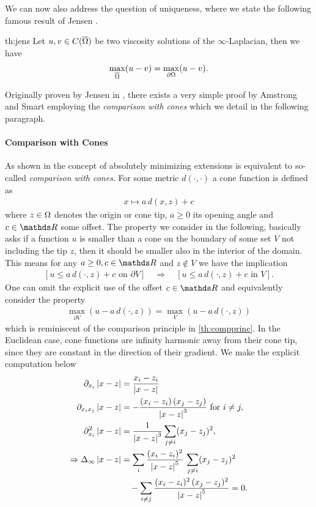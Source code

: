 We can now also address the question of uniqueness, where we state the following famous result of Jensen \cite{jensen1993uniqueness}.
%
\begin{theorem}{\cite{jensen1993uniqueness}}{th:jens} 
Let $u,v\in C(\overline{\Omega})$ be two viscosity solutions of the $\infty$-Laplacian, then we have
%
\begin{align*}
\max_{\overline{\Omega}} (u - v) = \max_{\partial\Omega} (u - v).
\end{align*}
\end{theorem}
%
%
\noindent%
Originally proven by Jensen in \cite{jensen1993uniqueness}, there exists a very simple proof by Amstrong and Smart \cite{armstrong2010easy} employing the \emph{comparison with cones} which we detail in the following paragraph.
%
%
%
\paragraph{Comparison with Cones} As shown in \cite{aronsson2004tour} the concept of absolutely minimizing extensions is equivalent to so-called \emph{comparison with cones}. For some metric $d(\cdot,\cdot)$ a cone function is defined as
%
\begin{align*}
x\mapsto a\, d(x,z) + c
\end{align*}
%
where $z\in\Omega$ denotes the origin or cone tip, $a\geq 0$ its opening angle and $c\in\R$ some offset. The property we consider in the following, basically asks if a function $u$ is smaller than a cone on the boundary of some set $V$ not including the tip $z$, then it should be smaller also in the interior of the domain. This means for any $a\geq 0,c\in\R$ and $z\notin V$ we have the implication
%
\begin{align*}
\left[u \leq a\, d(\cdot,z) + c \text{ on }\partial V\right]
\quad \Rightarrow\quad
\left[u \leq a\, d(\cdot,z) + c \text{ in } V\right].
\end{align*}
%
%
One can omit the explicit use of the offset $c\in\R$ and equivalently consider the property
%
\begin{align}\label{eq:conecont}
\max_{\partial V}\left(u - a\, d(\cdot,z)\right) = \max_{V}\left(u - a\, d(\cdot,z)\right)
\end{align}
%
which is reminiscent of the comparison principle in \cref{th:compprinc}. In the Euclidean case, cone functions are infinity harmonic away from their cone tip, since they are constant in the direction of their gradient. We make the explicit computation below
%
\begin{align*}
\partial_{x_i} \abs{x-z} &= \frac{x_i - z_i}{\abs{x-z}}\\
\partial_{x_i x_j}\abs{x-z} &= -\frac{(x_i - z_i)\, (x_j - z_j)}{\abs{x-z}^3}\text{ for } i\neq j,\\
\partial_{x_i}^2\abs{x-z} &= \frac{1}{\abs{x-z}^3} \sum_{j\neq i} (x_j - z_j)^2,\\
\Rightarrow
\Delta_\infty \abs{x-z} &= 
%
\sum_{i} \frac{(x_i - z_i)^2}{\abs{x-z}^5} \, \sum_{j\neq i} (x_j - z_j)^2\\
&\quad-\sum_{i\neq j}\frac{(x_i - z_i)^2\, (x_j - z_j)^2}{\abs{x-z}^5} = 0.
\end{align*}

